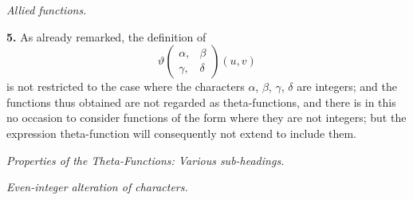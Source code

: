 \documentclass[12pt,a4paper]{article}
\theoremstyle{definition}
\begin{document}
\begin{center}
\textit{Allied functions.}
\end{center}

\vspace{0.5em}

\noindent\textbf{5.}\quad
As already remarked, the definition of
\[
\vartheta\begin{pmatrix} \alpha, & \beta \\ \gamma, & \delta \end{pmatrix}(u, v)
\]
is not restricted to the case where the characters $\alpha$, $\beta$, $\gamma$, $\delta$ are integers; and the functions thus obtained are not regarded as theta-functions, and there is in this no occasion to consider functions of the form where they are not integers; but the expression theta-function will consequently not extend to include them.

\vspace{1em}

\begin{center}
\textit{Properties of the Theta-Functions: Various sub-headings.}
\end{center}

\vspace{0.5em}

\begin{center}
\textit{Even-integer alteration of characters.}
\end{center}

\vspace{0.5em}
\end{document}
